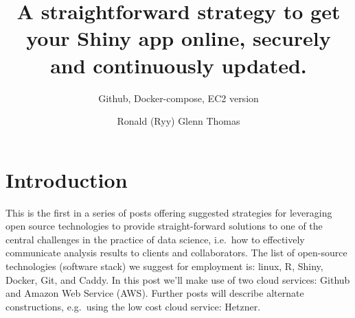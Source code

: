 \documentclass[
  letterpaper,
  DIV=11,
  numbers=noendperiod,
  oneside]{scrartcl}
\title{A straightforward strategy to get your Shiny app online, securely
and continuously updated.}
\subtitle{Github, Docker-compose, EC2 version}
\author{Ronald (Ryy) Glenn Thomas}
\date{}
\renewcommand*\contentsname{Table of contents}
\newcommand\contentsname{Table of contents}
\begin{document}
\maketitle
\ifdefined\Shaded\renewenvironment{Shaded}{\begin{tcolorbox}[frame hidden, sharp corners, borderline west={3pt}{0pt}{shadecolor}, boxrule=0pt, enhanced, interior hidden, breakable]}{\end{tcolorbox}}\fi

\renewcommand*\contentsname{Table of contents}
{
\hypersetup{linkcolor=}
\setcounter{tocdepth}{3}
\tableofcontents
}

\hypertarget{introduction}{%
\section{Introduction}\label{introduction}}

This is the first in a series of posts offering suggested strategies for
leveraging open source technologies to provide straight-forward
solutions to one of the central challenges in the practice of data
science, i.e.~how to effectively communicate analysis results to clients
and collaborators. The list of open-source technologies (software stack)
we suggest for employment is: linux, R, Shiny, Docker, Git, and Caddy.
In this post we'll make use of two cloud services: Github and Amazon Web
Service (AWS). Further posts will describe alternate constructions,
e.g.~using the low cost cloud service: Hetzner.
\end{document}
